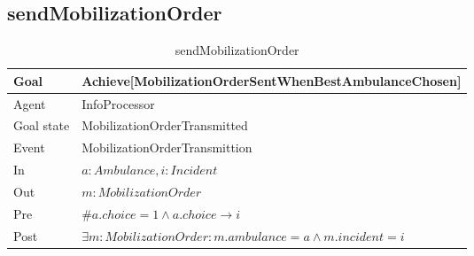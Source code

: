 \subsection{sendMobilizationOrder}
	
	
	\begin{table}[!h] \centering
		\begin{tabularx}{\textwidth}{|l|X|} \hline
			Goal & Achieve[MobilizationOrderSentWhenBestAmbulanceChosen] \\ \hline
			Agent & InfoProcessor \\ \hline
			Goal state & MobilizationOrderTransmitted \\ \hline
			Event & MobilizationOrderTransmittion \\ \hline
			In & $a: Ambulance, i: Incident$ \\ \hline
			Out & $m: MobilizationOrder$ \\ \hline
			Pre & $\#a.choice = 1 \wedge a.choice \rightarrow i$ \\ \hline
			Post & $\exists m: MobilizationOrder : m.ambulance = a \wedge m.incident = i$ \\ \hline
		\end{tabularx}
		\caption{sendMobilizationOrder}
	\end{table}
